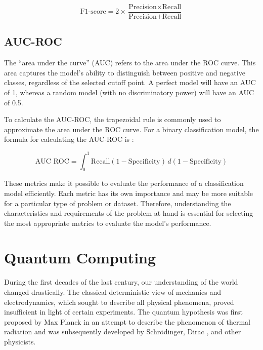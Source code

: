 \begin{center}
\begin{equation}
\text{F1-score} = 2 \times \dfrac{\text{Precision} \times \text{Recall}}{\text{Precision} + \text{Recall}}
\end{equation}
\end{center}


\subsection{AUC-ROC}

The ``area under the curve'' (AUC) refers to the area under the ROC curve. This area captures the model's ability to distinguish between positive and negative classes, regardless of the selected cutoff point. A perfect model will have an AUC of 1, whereas a random model (with no discriminatory power) will have an AUC of 0.5.

To calculate the AUC-ROC, the trapezoidal rule is commonly used to approximate the area under the ROC curve. For a binary classification model, the formula for calculating the AUC-ROC is \cite{Métricas}:

\begin{center}
\begin{equation}
\text{AUC ROC} = \int_{0}^{1} \text{Recall}(1-\text{Specificity})\,d(1-\text{Specificity})
\end{equation}
\end{center}

These metrics make it possible to evaluate the performance of a classification model efficiently. Each metric has its own importance and may be more suitable for a particular type of problem or dataset. Therefore, understanding the characteristics and requirements of the problem at hand is essential for selecting the most appropriate metrics to evaluate the model's performance.


\section{Quantum Computing}


During the first decades of the last century, our understanding of the world changed drastically. The classical deterministic view of mechanics and electrodynamics, which sought to describe all physical phenomena, proved insufficient in light of certain experiments. The quantum hypothesis was first proposed by Max Planck in an attempt to describe the phenomenon of thermal radiation and was subsequently developed by Schrödinger, Dirac \cite{Dirac}, and other physicists.

